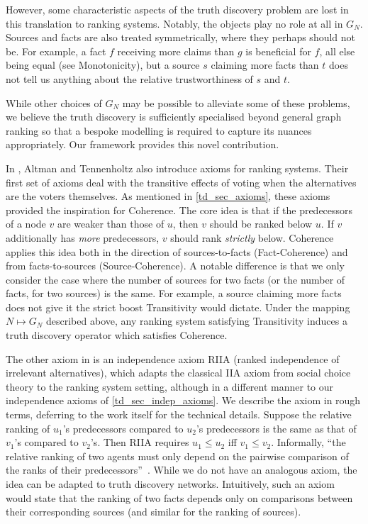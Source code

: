 However, some characteristic aspects of the truth discovery problem are lost in
this translation to ranking systems. Notably, the objects play no role at all
in $G_N$. Sources and facts are also treated symmetrically, where they perhaps
should not be. For example, a fact $f$ receiving more claims than $g$ is
beneficial for $f$, all else being equal (see Monotonicity), but a source $s$
claiming more facts than $t$ does not tell us anything about the relative
trustworthiness of $s$ and $t$.

While other choices of $G_N$ may be possible to alleviate some of these
problems, we believe the truth discovery is sufficiently specialised beyond
general graph ranking so that a bespoke modelling is required to capture its
nuances appropriately. Our framework provides this novel contribution.

In \cite{altman2008}, Altman and Tennenholtz also introduce axioms for ranking
systems. Their first set of axioms deal with the transitive effects of voting
when the alternatives are the voters themselves. As mentioned in
\cref{td_sec_axioms}, these axioms provided the inspiration for Coherence. The
core idea is that if the predecessors of a node $v$ are weaker than those of
$u$, then $v$ should be ranked below $u$. If $v$ additionally has \emph{more}
predecessors, $v$ should rank \emph{strictly} below. Coherence applies this
idea both in the direction of sources-to-facts (Fact-Coherence) and from
facts-to-sources (Source-Coherence). A notable difference is that we only
consider the case where the number of sources for two facts (or the number of
facts, for two sources) is the same. For example, a source claiming more facts
does not give it the strict boost Transitivity would dictate. Under the mapping $N
\mapsto G_N$ described above, any ranking system satisfying Transitivity
induces a truth discovery operator which satisfies Coherence.

The other axiom in \cite{altman2008} is an independence axiom RIIA (ranked
independence of irrelevant alternatives), which adapts the classical IIA axiom
from social choice theory to the ranking system setting, although in a
different manner to our independence axioms of \cref{td_sec_indep_axioms}. We
describe the axiom in rough terms, deferring to the work itself for the technical
details. Suppose the relative ranking of $u_1$'s predecessors compared to
$u_2$'s predecessors is the same as that of $v_1$'s compared to $v_2$'s. Then
RIIA requires $u_1 \le u_2$ iff $v_1 \le v_2$. Informally, ``the relative
ranking of two agents must only depend on the pairwise comparison of the ranks
of their predecessors''~\cite{altman2008}.
%
While we do not have an analogous axiom, the idea can be adapted to truth
discovery networks. Intuitively, such an axiom would state that the ranking of
two facts depends only on comparisons between their
corresponding sources (and similar for the ranking of sources).


